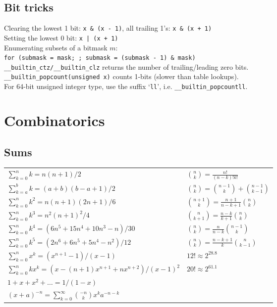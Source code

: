 \documentclass[12pt]{extarticle}
\begin{document}
\begin{multicols*}{2}
\subsection{Bit tricks}
Clearing the lowest 1 bit: \verb$x & (x - 1)$, all trailing 1's: \verb$x & (x + 1)$ \\
Setting the lowest 0 bit: \verb$x | (x + 1)$ \\
Enumerating subsets of a bitmask $m$: \\
\verb|for (submask = mask; ; submask = (submask - 1) & mask)| \\
\verb$__builtin_ctz/__builtin_clz$ returns the number of trailing/leading zero bits. \\
\verb$__builtin_popcount(unsigned x)$ counts 1-bits (slower than table lookups). \\
For 64-bit unsigned integer type, use the suffix `\verb$ll$', i.e. \verb$__builtin_popcountll$.



\section{Combinatorics}

\subsection{Sums}

\begin{tabular}{l l}
    $\sum_{k=0}^n k = n(n+1)/2$		& ${n \choose k} = \frac{n!}{(n-k)!k!}$ \\
    $\sum_{k=a}^b k = (a+b)(b-a+1)/2$   & ${n \choose k} = {n-1 \choose k} + {n-1 \choose k-1}$ \\
    $\sum_{k=0}^n k^2 = n(n+1)(2n+1)/6$ & ${n+1 \choose k} = \frac{n+1}{n-k+1} {n \choose k}$   \\
    $\sum_{k=0}^n k^3 = n^2(n+1)^2/4$   & ${n \choose k+1} = \frac{n-k}{k+1} {n \choose k}$     \\
    $\sum_{k=0}^n k^4 = (6n^5 + 15n^4 + 10n^3 - n)/30$  & ${n \choose k} = \frac{n}{n-k} {n-1 \choose k}$       \\
    $\sum_{k=0}^n k^5 = (2n^6 + 6n^5 + 5n^4 - n^2)/12$  & ${n \choose k} = \frac{n-k+1}{k} {n \choose k-1}$     \\
    $\sum_{k=0}^n x^k = (x^{n+1} - 1)/(x - 1)$  & $12! \approx 2^{28.8}$ \\
    $\sum_{k=0}^n kx^k = (x - (n+1)x^{n+1} + nx^{n+2})/(x-1)^2$	& $20! \approx 2^{61.1}$ \\
    $1 + x + x^2 + \dots = 1 / (1 - x)$ \\
    $(x+a)^{-n} = \sum_{k=0}^{\infty} {-n \choose k} x^k a^{-n-k}$ \\
\end{tabular}


\end{multicols*}
\end{document}
